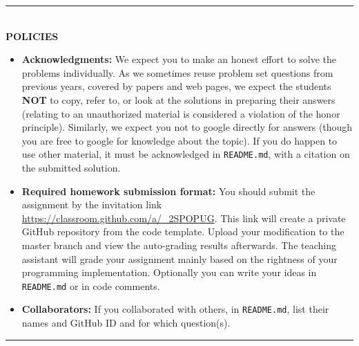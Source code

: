 \vspace{3em}

\rule{\textwidth}{1pt}
\\
\textbf{POLICIES}
\begin{itemize}
\item {\bf Acknowledgments: \/} 
  We expect you to make an honest effort to solve the problems individually.  As we sometimes reuse problem set questions from previous years, covered by papers and web pages, we expect the students \textbf{NOT} to copy, refer to, or look at the solutions in preparing their answers (relating to an unauthorized material is considered a violation of the honor principle). Similarly, we expect you not to google directly for answers (though you are free to google for knowledge about the topic). If you do happen to use other material, it must be acknowledged in \texttt{README.md}, with a citation on the submitted solution.
  
\item {\bf Required homework submission format: \/}
  You should submit the assignment by the invitation link \url{https://classroom.github.com/a/_2SPOPUG}. This link will create a private GitHub repository from the code template.
  Upload your modification to the master branch and view the auto-grading results afterwards. The teaching assistant will grade your
  assignment mainly based on the rightness of your programming implementation.
  Optionally you can write your ideas in \texttt{README.md} or in code comments.
  

\item {\bf Collaborators: \/}
If you collaborated with others, in \texttt{README.md}, list their names and GitHub ID and for which question(s).
\end{itemize}
\rule{\textwidth}{1pt}
